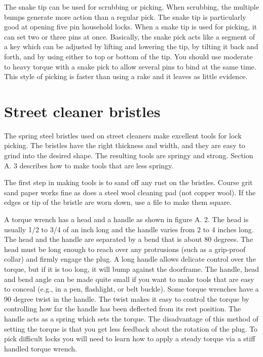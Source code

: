 The snake tip can be used for scrubbing or picking. When scrubbing, the multiple bumps generate 
more action than a regular pick. The snake tip is particularly good at opening five pin household locks. 
When a snake tip is used for picking, it can set two or three pins at 
once. Basically, the snake pick acts like a segment of a key which can be adjusted by lifting 
and lowering the tip, by tilting it back and forth, and by using either to top or bottom of 
the tip. You should use moderate to heavy torque with a snake pick to allow several pins to 
bind at the same time. This style of picking is faster than using a rake and it leaves as little 
evidence.

\section{Street cleaner bristles}
The spring steel bristles used on street cleaners make excellent tools for lock picking. The 
bristles have the right thickness and width, and they are easy to grind into the desired shape. 
The resulting tools are springy and strong. Section A. 3 describes how to make tools that 
are less springy. 

The first step in making tools is to sand off any rust on the bristles. Course grit sand 
paper works fine as does a steel wool cleaning pad (not copper wool). If the edges or tip of 
the bristle are worn down, use a file to make them square. 

A torque wrench has a head and a handle as shown in figure A. 2. The head is usually 
1/2 to 3/4 of an inch long and the handle varies from 2 to 4 inches long. The head and the 
handle are separated by a bend that is about 80 degrees. The head must be long enough 
to reach over any protrusions (such as a grip-proof collar) and firmly engage the plug. A 
long handle allows delicate control over the torque, but if it is too long, it will bump against 
the doorframe. The handle, head and bend angle can be made quite small if you want to 
make tools that are easy to conceal (e.g., in a pen, flashlight, or belt buckle). Some torque 
wrenches have a 90 degree twist in the handle. The twist makes it easy to control the torque 
by controlling how far the handle has been deflected from its rest position. The handle acts 
as a spring which sets the torque. The disadvantage of this method of setting the torque is 
that you get less feedback about the rotation of the plug. To pick difficult locks you will 
need to learn how to apply a steady torque via a stiff handled torque wrench. 

